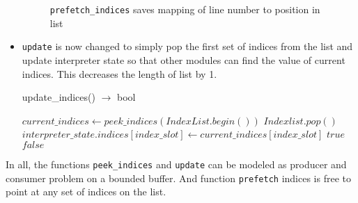 \begin{itemize}
\begin{figure}[h]
    \caption{\texttt{prefetch\_indices} saves mapping of line number to position in list} \label{fig:prefetch_indices map}
  \end{figure}

\item \texttt{update} is now changed to simply pop the first set of indices from
  the list and update interpreter state so that other modules can find the value
  of current indices. This decreases the length of list by 1.
  \begin{algorithm}  {update\_indices() $\rightarrow$ bool}
    \singlespacing

    \begin{algorithmic}[1]
      \State $current\_indices \gets peek\_indices(IndexList.begin())$
      \State $Indexlist.pop()$
      \State $interpreter\_state.indices[index\_slot] \gets current\_indices[index\_slot]$
      \EndFor
      \State \Return $true$
      \Else
      \State \Return $false$
      \EndIf
      \EndFunction
    \end{algorithmic}
  \end{algorithm}
\end{itemize}

In all, the functions \texttt{peek\_indices} and \texttt{update} can be modeled
as producer and consumer problem on a bounded buffer. And function \texttt{prefetch}
indices is free to point at any set of indices on the list.

